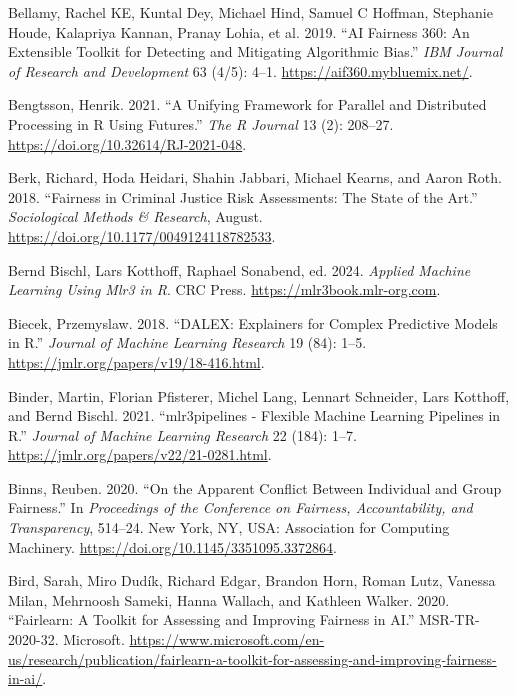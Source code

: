 \begin{CSLReferences}{1}{0}
\leavevmode{}%
Bellamy, Rachel KE, Kuntal Dey, Michael Hind, Samuel C Hoffman, Stephanie Houde, Kalapriya Kannan, Pranay Lohia, et al. 2019. {``{AI Fairness 360}: An Extensible Toolkit for Detecting and Mitigating Algorithmic Bias.''} \emph{IBM Journal of Research and Development} 63 (4/5): 4--1. \url{https://aif360.mybluemix.net/}.

\leavevmode{}%
Bengtsson, Henrik. 2021. {``A Unifying Framework for Parallel and Distributed Processing in {R} Using Futures.''} \emph{The R Journal} 13 (2): 208--27. \url{https://doi.org/10.32614/RJ-2021-048}.

\leavevmode{}%
Berk, Richard, Hoda Heidari, Shahin Jabbari, Michael Kearns, and Aaron Roth. 2018. {``{Fairness in Criminal Justice Risk Assessments: The State of the Art}.''} \emph{Sociological Methods \& Research}, August. \url{https://doi.org/10.1177/0049124118782533}.

\leavevmode{}%
Bernd Bischl, Lars Kotthoff, Raphael Sonabend, ed. 2024. \emph{Applied Machine Learning Using Mlr3 in {R}}. CRC Press. \url{https://mlr3book.mlr-org.com}.

\leavevmode{}%
Biecek, Przemyslaw. 2018. {``{DALEX}: {Explainers for Complex Predictive Models} in {R}.''} \emph{Journal of Machine Learning Research} 19 (84): 1--5. \url{https://jmlr.org/papers/v19/18-416.html}.

\leavevmode{}%
Binder, Martin, Florian Pfisterer, Michel Lang, Lennart Schneider, Lars Kotthoff, and Bernd Bischl. 2021. {``{mlr3pipelines - Flexible Machine Learning Pipelines in R}.''} \emph{Journal of Machine Learning Research} 22 (184): 1--7. \url{https://jmlr.org/papers/v22/21-0281.html}.

\leavevmode{}%
Binns, Reuben. 2020. {``On the Apparent Conflict Between Individual and Group Fairness.''} In \emph{Proceedings of the Conference on Fairness, Accountability, and Transparency}, 514--24. New York, NY, USA: Association for Computing Machinery. \url{https://doi.org/10.1145/3351095.3372864}.

\leavevmode{}%
Bird, Sarah, Miro Dudík, Richard Edgar, Brandon Horn, Roman Lutz, Vanessa Milan, Mehrnoosh Sameki, Hanna Wallach, and Kathleen Walker. 2020. {``Fairlearn: A Toolkit for Assessing and Improving Fairness in {AI}.''} MSR-TR-2020-32. Microsoft. \url{https://www.microsoft.com/en-us/research/publication/fairlearn-a-toolkit-for-assessing-and-improving-fairness-in-ai/}.


\end{CSLReferences}
